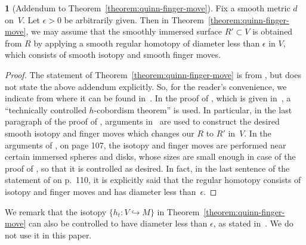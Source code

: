 \documentclass[11pt]{amsart}
\theoremstyle{definition}
\theoremstyle{theorem-giventitle}
\newtheorem{theorem-named}{}
\theoremstyle{definition-giventitle}
\numberwithin{equation}{section}
\begin{document}
\begin{theorem-named}[Addendum to Theorem~\ref{theorem:quinn-finger-move}]
  Fix a smooth metric $d$ on~$V$.
  Let $\epsilon>0$ be arbitrarily given.
  Then in Theorem~\ref{theorem:quinn-finger-move}, we may assume that
  the smoothly immersed surface $R'\subset V$ is obtained from $R$ by applying a smooth regular homotopy of diameter less than $\epsilon$ in $V$, which consists of smooth isotopy and smooth finger moves.
\end{theorem-named}

\begin{proof}
  The statement of Theorem~\ref{theorem:quinn-finger-move} is from \cite[8.1A]{Freedman-Quinn:1990-1}, but \cite[8.1A]{Freedman-Quinn:1990-1} does not state the above addendum explicitly.
  So, for the reader's convenience, we indicate from where it can be found in~\cite{Freedman-Quinn:1990-1}.
  In the proof of \cite[Theorem~8.1A]{Freedman-Quinn:1990-1}, which is given in~\cite[8.1, p.~115--116]{Freedman-Quinn:1990-1}, a ``technically controlled $h$-cobordism theorem'' \cite[7.2C]{Freedman-Quinn:1990-1} is used.
  In particular, in the last paragraph of the proof of \cite[7.2C]{Freedman-Quinn:1990-1}, arguments in~\cite[7.1D]{Freedman-Quinn:1990-1} are used to construct the desired smooth isotopy and finger moves which changes our $R$ to $R'$ in~$V$.
  In the arguments of \cite[7.1D]{Freedman-Quinn:1990-1}, on page 107,
  the isotopy and finger moves are performed near certain immersed spheres and disks, whose sizes are small enough in case of the proof of \cite[7.2C]{Freedman-Quinn:1990-1}, so that it is controlled as desired.
  In fact, in the last sentence of the statement of \cite[Theorem~7.2C]{Freedman-Quinn:1990-1} on p.~110, it is explicitly said that the regular homotopy consists of isotopy and finger moves and has diameter less than~$\epsilon$.
\end{proof}

We remark that the isotopy $\{h_t\colon V\hookrightarrow M\}$ in Theorem~\ref{theorem:quinn-finger-move} can also be controlled to have diameter less than $\epsilon$, as stated in~\cite[8.1A]{Freedman-Quinn:1990-1}.
We do not use it in this paper.
\end{document}
